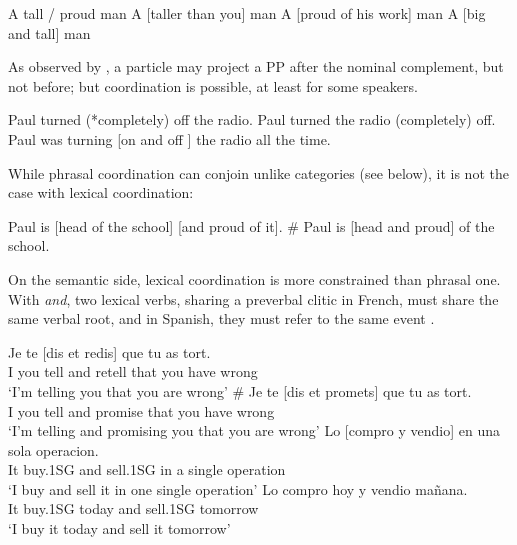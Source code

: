 \documentclass[output=paper]{langsci/langscibook}
\begin{document}
\begin{exe}
 \ex
\begin{xlista}
\ex A tall / proud man
\ex *A [taller than you] man
\ex *A [proud of his work] man
\ex A [big and tall] man
\end{xlista}
\end{exe}

As observed by \citet{hpsg1}, a particle may project a  PP  after the nominal complement, but not before; but coordination is possible, at least for some speakers.

\begin{exe}
 \ex
\begin{xlista}
\ex Paul turned (*completely) off the radio.
\ex Paul turned the radio (completely) off.
\ex Paul was turning [on and off ] the radio all the time.
\end{xlista}
\end{exe}

While phrasal coordination can conjoin unlike categories (see below), it is not the case with lexical coordination:

\begin{exe}
 \ex
\begin{xlista}
\ex Paul is  [head of the school] [and proud of it].
\ex \# Paul is [head and proud] of the school.
\end{xlista}
\end{exe}

On the semantic side, lexical coordination is more constrained than phrasal one. With \textit{and}, two lexical verbs, sharing a preverbal clitic in French, must share the same verbal root, and in Spanish, they must refer to the same event \citep{Bosque:86}.

\begin{exe}
 \ex
\begin{xlista}
\ex \gll Je te [dis et redis] que tu as tort. \\
I you tell and retell that you have wrong\\
\glt `I’m telling you that you are wrong'
\ex \gll \# Je te [dis et promets] que tu as tort.\\
I you tell and promise that you have wrong\\
\glt `I’m telling and promising you that you are wrong'
\ex \gll Lo [compro y vendio] en una sola operacion.\\
It buy.1SG and sell.1SG in a single operation\\
\glt `I buy and sell it in one single operation'
\ex \gll *Lo compro hoy y vendio ma\~{n}ana.\\
It buy.1SG today and sell.1SG tomorrow \\
\glt `I buy it today and sell it tomorrow'
\end{xlista}
\end{exe}
\end{document}
